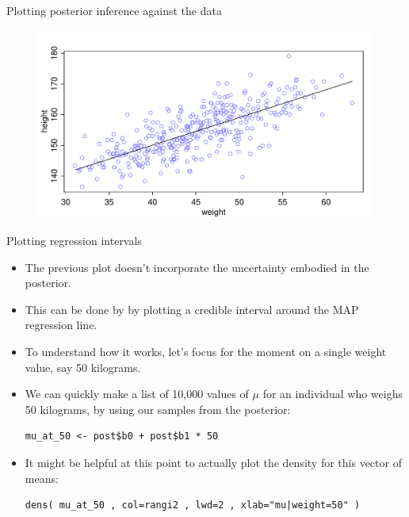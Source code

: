 \documentclass[handout]{beamer}
\begin{document}
\begin{frame}{Plotting posterior inference against the data}

\begin{figure}[h!]
	\centering
	\includegraphics[scale=0.65]{pics/height_points.pdf}
\end{figure}

\end{frame}


\begin{frame}[fragile]{Plotting regression intervals}
\scriptsize{
\begin{itemize}
\item The previous plot doesn't incorporate the uncertainty embodied in the posterior.

\item This can be done by by plotting a credible interval around the MAP regression line.

\item To understand how it works, let's focus for the moment on a single weight value, say 50 kilograms. 

\item We can quickly make a list of 10,000 values of $\mu$ for an individual who weighs 50 kilograms, by using our samples from the posterior:

\begin{verbatim}
mu_at_50 <- post$b0 + post$b1 * 50 
\end{verbatim}

\item It might be helpful at this point to actually plot the density for this vector of means:

\begin{verbatim}
dens( mu_at_50 , col=rangi2 , lwd=2 , xlab="mu|weight=50" )
\end{verbatim}


\end{itemize}
 

 
}
\end{frame}
\end{document}
